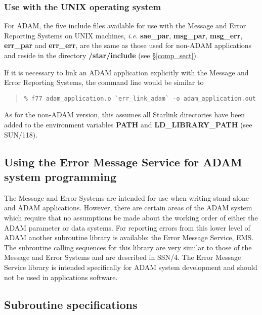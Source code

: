 \subsubsection {Use with the UNIX operating system}

For ADAM, the five include files available for use with the Message and Error
Reporting Systems on UNIX machines, {\em i.e.} {\bf sae\_par}, {\bf msg\_par},
{\bf msg\_err},  {\bf err\_par} and {\bf err\_err}, are the same as those 
used for non-ADAM applications and reside in the  directory
{\bf /star/include} (see \S\ref{comp_sect}).

If it is necessary to link an ADAM application explicitly with the Message and
Error Reporting Systems, the command line would be similar to

\begin {quote}
\begin {small}
\begin{verbatim}
% f77 adam_application.o `err_link_adam` -o adam_application.out
\end{verbatim}
\end {small}
\end {quote}

\begin {sloppypar}
As for the non-ADAM version, this assumes all Starlink directories have been
added to the environment variables {\bf PATH} and {\bf LD\_LIBRARY\_PATH} (see
SUN/118).
\end {sloppypar}


\subsection {Using the Error Message Service for ADAM system programming}

The Message and Error Systems are intended for use when writing stand-alone and
ADAM applications. 
However, there are certain areas of the ADAM system which require that no 
assumptions be made about the working order of either the ADAM parameter 
or data systems.
For reporting errors from this lower level of ADAM another subroutine library
is available: the Error Message Service, EMS. 
The subroutine calling sequences for this library are very similar to those of
the Message and Error Systems and are described in SSN/4.
The Error Message Service library is intended specifically for ADAM system 
development and should not be used in applications software.

\subsection {Subroutine specifications}

